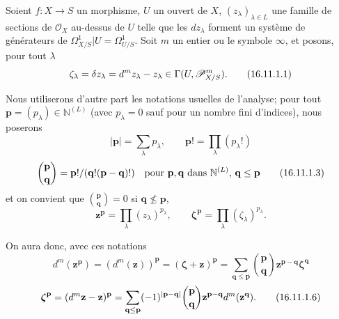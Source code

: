 \begin{env}[16.11.1]
\label{IV.16.11.1}
Soient $f:X\to S$ un morphisme, $U$ un ouvert de $X$,
$(z_\lambda)_{\lambda\in L}$ une famille de sections de $\mathcal{O}_X$
au-dessus de $U$ telle que les $dz_\lambda$ forment un système de générateurs
de $\varOmega_{X/S}^1|U=\varOmega_{U/S}^1$. Soit $m$ un entier ou le symbole
$\infty$, et posons, pour tout $\lambda$
\[
  \zeta_\lambda=\delta z_\lambda=d^m z_\lambda- z_\lambda
  \in\Gamma(U,\mathscr{P}_{X/S}^m).
  \tag{16.11.1.1}
  \label{IV.16.11.1.1}
\]

Nous utiliserons d'autre part les notations usuelles de l'analyse; pour tout
$\mathbf{p}=(p_\lambda)\in\mathbb{N}^{(L)}$ (avec $p_\lambda=0$ sauf pour un
nombre fini d'indices), nous poserons
\[
  |\mathbf{p}|=\sum_\lambda p_\lambda,
  \qquad \mathbf{p}!=\prod_\lambda(p_\lambda!)
  \tag{16.11.1.2}
  \label{IV.16.11.1.2}
\]
\[
  \binom{\mathbf{p}}{\mathbf{q}}
  =\mathbf{p}!/(\mathbf{q}!(\mathbf{p}-\mathbf{q})!)
  \quad\text{pour $\mathbf{p},\mathbf{q}$ dans $\mathbb{N}^{(L)}$,
  $\mathbf{q}\leq\mathbf{p}$}
  \tag{16.11.1.3}
  \label{IV.16.11.1.3}
\]
et on convient que $\binom{\mathbf{p}}{\mathbf{q}}=0$ si
$\mathbf{q}\nleq\mathbf{p}$,
\[
  \mathbf{z}^{\mathbf{p}}=\prod_\lambda(z_\lambda)^{p_\lambda},
  \qquad
  \boldsymbol{\zeta}^{\mathbf{p}}=\prod_\lambda(\zeta_\lambda)^{p_\lambda}.
  \tag{16.11.1.4}
  \label{IV.16.11.1.4}
\]

On aura donc, avec ces notations
\[
  d^m(\mathbf{z}^{\mathbf{p}})
  =(d^m(\mathbf{z}))^{\mathbf{p}}
  =(\boldsymbol{\zeta}+\mathbf{z})^{\mathbf{p}}
  =\sum_{\mathbf{q}\leq\mathbf{p}}
    \binom{\mathbf{p}}{\mathbf{q}}
    \mathbf{z}^{\mathbf{p}-\mathbf{q}}\boldsymbol{\zeta}^{\mathbf{q}}
  \tag{16.11.1.5}
  \label{IV.16.11.1.5}
\]
\[
  \boldsymbol{\zeta}^{\mathbf{p}}
  =(d^m\mathbf{z}-\mathbf{z})^{\mathbf{p}}
  =\sum_{\mathbf{q}\leq\mathbf{p}}
    (- 1)^{|\mathbf{p}-\mathbf{q}|}
    \binom{\mathbf{p}}{\mathbf{q}}
    \mathbf{z}^{\mathbf{p}-\mathbf{q}}d^m(\mathbf{z}^{\mathbf{q}}).
  \tag{16.11.1.6}
  \label{IV.16.11.1.6}
\]


\end{env}

